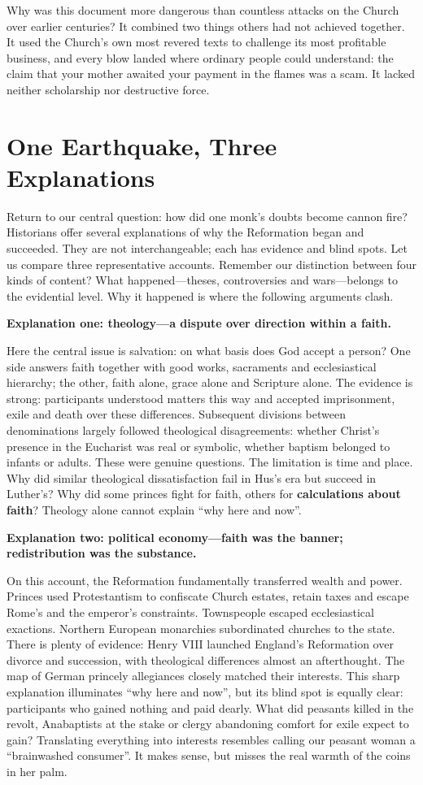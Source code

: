 Why was this document more dangerous than countless attacks on the Church over earlier centuries? It combined two things others had not achieved together. It used the Church's own most revered texts to challenge its most profitable business, and every blow landed where ordinary people could understand: the claim that your mother awaited your payment in the flames was a scam. It lacked neither scholarship nor destructive force.

\section{One Earthquake, Three Explanations}
Return to our central question: how did one monk's doubts become cannon fire? Historians offer several explanations of why the Reformation began and succeeded. They are not interchangeable; each has evidence and blind spots. Let us compare three representative accounts. Remember our distinction between four kinds of content? What happened---theses, controversies and wars---belongs to the evidential level. Why it happened is where the following arguments clash.

\textbf{Explanation one: theology---a dispute over direction within a faith.}

Here the central issue is salvation: on what basis does God accept a person? One side answers faith together with good works, sacraments and ecclesiastical hierarchy; the other, faith alone, grace alone and Scripture alone. The evidence is strong: participants understood matters this way and accepted imprisonment, exile and death over these differences. Subsequent divisions between denominations largely followed theological disagreements: whether Christ's presence in the Eucharist was real or symbolic, whether baptism belonged to infants or adults. These were genuine questions. The limitation is time and place. Why did similar theological dissatisfaction fail in Hus's era but succeed in Luther's? Why did some princes fight for faith, others for \textbf{calculations about faith}? Theology alone cannot explain ``why here and now''.

\textbf{Explanation two: political economy---faith was the banner; redistribution was the substance.}

On this account, the Reformation fundamentally transferred wealth and power. Princes used Protestantism to confiscate Church estates, retain taxes and escape Rome's and the emperor's constraints. Townspeople escaped ecclesiastical exactions. Northern European monarchies subordinated churches to the state. There is plenty of evidence: Henry VIII launched England's Reformation over divorce and succession, with theological differences almost an afterthought. The map of German princely allegiances closely matched their interests. This sharp explanation illuminates ``why here and now'', but its blind spot is equally clear: participants who gained nothing and paid dearly. What did peasants killed in the revolt, Anabaptists at the stake or clergy abandoning comfort for exile expect to gain? Translating everything into interests resembles calling our peasant woman a ``brainwashed consumer''. It makes sense, but misses the real warmth of the coins in her palm.

